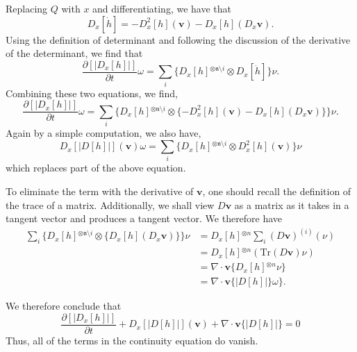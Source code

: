 \documentclass[11pt]{article}
\theoremstyle{remark}
\begin{document}
Replacing $Q$ with $x$ and differentiating, 
we have that 
\[
 D_x[\dot{h}]  
  =  - D_x^2[h] (\ensuremath{\boldsymbol{v}})  - D_x[h] (D_x\ensuremath{\boldsymbol{v}}).
\]
Using the definition of determinant and following the discussion of
the derivative of the determinant, we find that 
\[ \ensuremath{\frac{\partial {[\ensuremath{\lvert {D_x[h]} \rvert}]}}{\partial {t}}} \omega = \sum_i \{D_x[h] \ensuremath{^{\otimes \ensuremath{\mathfrak{n}} \setminus
  i} } \otimes D_x[\dot{h}]\} \nu. 
\]
Combining these two equations, we find, 
\[ \ensuremath{\frac{\partial {[\ensuremath{\lvert {D_x[h]} \rvert}]}}{\partial {t}}} \omega = \sum_i \{D_x[h] \ensuremath{^{\otimes \ensuremath{\mathfrak{n}} \setminus
  i} } \otimes\{ - D_x^2[h] (\ensuremath{\boldsymbol{v}})  - D_x[h] (D_x\ensuremath{\boldsymbol{v}})\}\} \nu. 
\]
Again by a simple computation, we also have, 
\[ D_x[\ensuremath{\lvert { D[h]} \rvert}] (\ensuremath{\boldsymbol{v}}) \omega = \sum_i \{D_x[h] \ensuremath{^{\otimes \ensuremath{\mathfrak{n}}
  \setminus i } } 
\otimes  D^2_x [h] (\ensuremath{\boldsymbol{v}}) \} \nu
\]
which replaces part of the above equation. 

To eliminate the term with the derivative of \ensuremath{\boldsymbol{v}}, one should
recall the definition of the trace of a matrix. Additionally, we shall 
view $D \ensuremath{\boldsymbol{v}}$
 as a matrix as it takes in a tangent vector and
produces a tangent vector. We therefore have  
\[
\begin{split}
 \sum_i \{D_x[h] \ensuremath{^{\otimes \ensuremath{\mathfrak{n}} \setminus
  i} } \otimes\{D_x[h] (D_x\ensuremath{\boldsymbol{v}})\}\} \nu
& =
 D_x [h] \ensuremath{^{\otimes n} } \sum_i  (D\ensuremath{\boldsymbol{v}})^{(i)}(\nu)\\
&  =  D_x[h] \ensuremath{^{\otimes n} } (\ensuremath{\textrm{Tr}} (D\ensuremath{\boldsymbol{v}}) \nu) \\
&= \nabla \cdot \ensuremath{\boldsymbol{v}} \{ D_x[h] \ensuremath{^{\otimes n} } \nu\} \\
&=  \nabla \cdot \ensuremath{\boldsymbol{v}} \{ \ensuremath{\lvert {D [h]} \rvert}\} \omega\}  .
\end{split}
\]


We therefore conclude that 
\[ 
\ensuremath{\frac{\partial {[\ensuremath{\lvert {D_x[h]} \rvert}]}}{\partial {t}}}  + D_x[\ensuremath{\lvert { D[h]} \rvert}](\ensuremath{\boldsymbol{v}}) +  \nabla \cdot \ensuremath{\boldsymbol{v}} \{
 \ensuremath{\lvert {D [h]} \rvert}\} = 0
\]
Thus, all of the terms in the continuity equation do vanish. 
\end{document}
